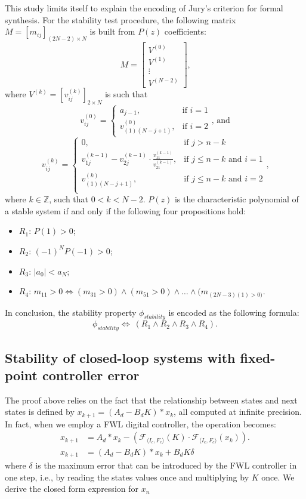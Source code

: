 \documentclass[runningheads,a4paper]{llncs}
\begin{document}
This study limits itself to explain the encoding of Jury's criterion for formal synthesis.  
For the stability  test procedure, the following matrix 
$M=[m_{ij}]_{(2N-2)\times N}$ is built  from $P(z)$ coefficients:
$$
M=\left[
\begin{matrix}
  V^{(0)} \\
  V^{(1)} \\
  \vdots \\
  V^{(N-2)}
 \end{matrix}
\right]\mbox{,}
$$
\noindent where $V^{(k)}=[v^{(k)}_{ij}]_{2\times N}$ is such that
$$
v^{(0)}_{ij}=\begin{cases} 
a_{j-1}, & \mbox{if } i=1 \\   v^{(0)}_{(1)(N-j+1)}, & \mbox{if } i=2 
\end{cases}\mbox{, and} 
$$
$$
v^{(k)}_{ij}=\begin{cases} 
0, & \mbox{if } j>n-k\\
v^{(k-1)}_{1j}-v^{(k-1)}_{2j}\cdot\frac{v^{(k-1)}_{11}}{v^{(k-1)}_{21}}, & \mbox{if } j\leq n-k  \mbox{ and } i=1 \\
v^{(k)}_{(1)(N-j+1)}, & \mbox{if } j\leq n-k \mbox{ and } i=2 \\
\end{cases} \mbox{,}
$$
\noindent where $k\in\mathbb{Z}$, such that $0<k<N-2$. $P(z)$ is the 
characteristic polynomial of a stable system if and only if the following 
four propositions hold:
\begin{itemize}
\item $R_{1}$: $P(1)>0$;
\item $R_{2}$: $(-1)^{N}P(-1)>0$;
\item $R_{3}$: $\vert{a_{0}}\vert <a_{N}$;
\item $R_{4}$: $m_{11}>0\iff (m_{31}>0)\wedge (m_{51}>0)\wedge \dots \wedge (m_{(2N-3)(1)>0)}$.
\end{itemize}
In conclusion, the stability property $\phi_{stability}$ is encoded as the following formula:
$$
\phi_{stability}\iff \ (R_{1} \wedge R_{2} \wedge R_{3} \wedge R_{4}).
$$

\subsection{Stability of closed-loop systems with fixed-point controller error}

The proof above relies on the fact that the relationship between states and next states is defined by
$x_{k+1} = (A_d  - B_dK)*x_k$, all computed at infinite precision. In fact, when we employ a FWL digital controller, 
the operation becomes:
\begin{align*}
x_{k+1} &= A_d * x_{k} -(\mathcal{F}_{\langle I_c,F_c \rangle}(K)\cdot\mathcal{F}_{\langle I_c,F_c \rangle}(x_{k})).  \\
x_{k+1} &= (A_d  - B_dK)*x_k + B_dK\delta
\end{align*}
where $\delta$ is the maximum error that can be introduced by the FWL controller in one step, i.e., by reading the states values once and multiplying by $K$ once. We derive the closed form expression for $x_n$
\end{document}
